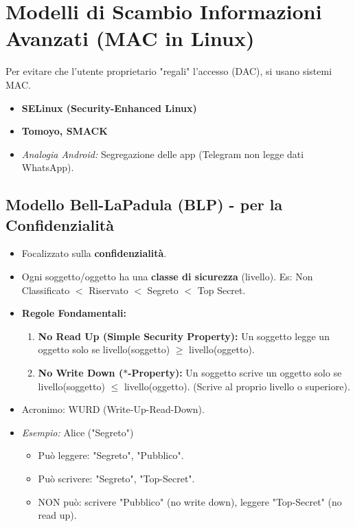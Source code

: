 \section{Modelli di Scambio Informazioni Avanzati (MAC in Linux)}
Per evitare che l'utente proprietario "regali" l'accesso (DAC), si usano sistemi MAC.
\begin{itemize}
    \item \textbf{SELinux (Security-Enhanced Linux)}
    \item \textbf{Tomoyo, SMACK}
    \item \textit{Analogia Android:} Segregazione delle app (Telegram non legge dati WhatsApp).
\end{itemize}

\subsection{Modello Bell-LaPadula (BLP) - per la Confidenzialità}
\begin{itemize}
    \item Focalizzato sulla \textbf{confidenzialità}.
    \item Ogni soggetto/oggetto ha una \textbf{classe di sicurezza} (livello). Es: Non Classificato $<$ Riservato $<$ Segreto $<$ Top Secret.
    \item \textbf{Regole Fondamentali:}
    \begin{enumerate}
        \item \textbf{No Read Up (Simple Security Property):} Un soggetto legge un oggetto solo se livello(soggetto) $\geq$ livello(oggetto).
        \item \textbf{No Write Down ($\ast$-Property):} Un soggetto scrive un oggetto solo se livello(soggetto) $\leq$ livello(oggetto). (Scrive al proprio livello o superiore).
    \end{enumerate}
    \item Acronimo: WURD (Write-Up-Read-Down).
    \item \textit{Esempio:} Alice ("Segreto")
    \begin{itemize}
        \item Può leggere: "Segreto", "Pubblico".
        \item Può scrivere: "Segreto", "Top-Secret".
        \item NON può: scrivere "Pubblico" (no write down), leggere "Top-Secret" (no read up).
    \end{itemize}
\end{itemize}

